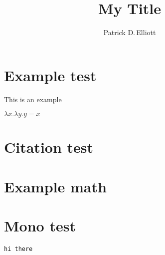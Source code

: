 \documentclass{ling-paper}
\title{My Title}
\author{Patrick D.\,Elliott}
\begin{document}
\maketitle

\section{Example test}

\begin{ex}
This is an example
\end{ex}

\begin{ex}
\(λ x . λ y . y = x\)
\end{ex}

\section{Citation test}

\section{Example math}

\section{Mono test}

\texttt{hi there}

\printbibliography
\end{document}
